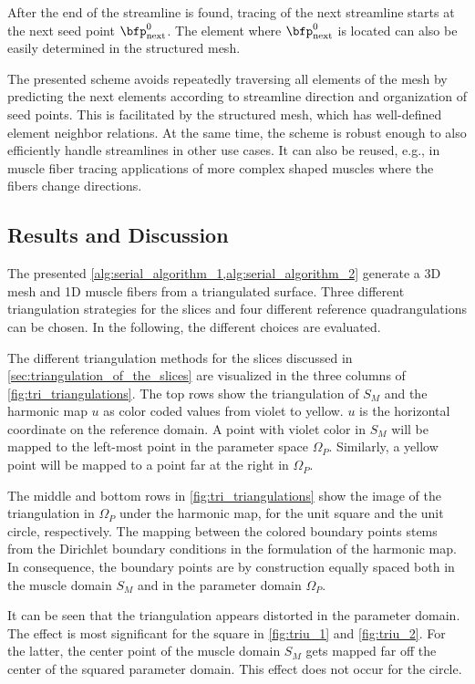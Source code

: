 After the end of the streamline is found, tracing of the next streamline starts at the next seed point $\bfp^0_\text{next}$. The element where $\bfp^0_\text{next}$ is located can also be easily determined in the structured mesh.

The presented scheme avoids repeatedly traversing all elements of the mesh by predicting the next elements according to streamline direction and organization of seed points. This is facilitated by the structured mesh, which has well-defined element neighbor relations.
At the same time, the scheme is robust enough to also efficiently handle streamlines in other use cases. It can also be reused, e.g., in muscle fiber tracing applications of more complex shaped muscles where the fibers change directions.

\subsection{Results and Discussion}\label{sec:mesh_generation_0_results_and_discussion}
The presented \cref{alg:serial_algorithm_1,alg:serial_algorithm_2} generate a 3D mesh and 1D muscle fibers from a triangulated surface. Three different triangulation strategies for the slices and four different reference quadrangulations can be chosen. In the following, the different choices are evaluated.

The different triangulation methods for the slices discussed in \cref{sec:triangulation_of_the_slices} are visualized in the three columns of \cref{fig:tri_triangulations}. 
The top rows show the triangulation of $S_M$ and the harmonic map $u$ as color coded values from violet to yellow. $u$ is the horizontal coordinate on the reference domain. A point with violet color in $S_M$ will be mapped to the left-most point in the parameter space $\Omega_P$. Similarly, a yellow point will be mapped to a point far at the right in $\Omega_P$.

The middle and bottom rows in \cref{fig:tri_triangulations} show the image of the triangulation in $\Omega_P$ under the harmonic map, for the unit square and the unit circle, respectively. The mapping between the colored boundary points stems from the Dirichlet boundary conditions in the formulation of the harmonic map. In consequence, the boundary points are by construction equally spaced both in the muscle domain $S_M$ and in the parameter domain $\Omega_P$.

It can be seen that the triangulation appears distorted in the parameter domain. The effect is most significant for the square in \cref{fig:triu_1} and \cref{fig:triu_2}. For the latter, the center point of the muscle domain $S_M$ gets mapped far off the center of the squared parameter domain. This effect does not occur for the circle.

